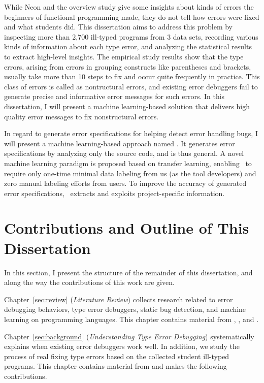 \documentclass[12pt]{report}	%
\begin{document}
While Neon and the overview study give some insights about kinds of errors the beginners of
functional programming made, they do not tell how errors were fixed and what students did.
%
This dissertation aims to address this problem by inspecting more than 2,700
ill-typed programs from 3 data sets,
recording various kinds of information about each type error, 
and analyzing the statistical results to extract high-level insights.
%
The empirical study results show that the type errors, arising from errors in grouping constructs like parentheses and brackets,
usually take more than 10 steps to fix and occur quite frequently in practice.
This class of errors is called as nontructural errors,
and existing error debuggers fail to generate precise and informative error messages for such errors.
In this dissertation, I will present a machine learning-based solution that delivers high quality error messages to fix nonstructural errors.
%

In regard to generate error specifications for helping detect error handling bugs,
I will present a machine learning-based approach named \newTool. 
It generates error specifications by analyzing only the source code, 
and is thus general. 
%
A novel machine learning paradigm is proposed based on transfer learning,
enabling \newTool\ to require only one-time minimal data labeling from us (as the tool developers)
and zero manual labeling efforts from users.
%
To improve the accuracy of generated error specifications,
\newTool\ extracts and exploits project-specific information.


\section{Contributions and Outline of This Dissertation}

In this section, I present the structure of the remainder of this dissertation,
and along the way the contributions of this work are given.

Chapter~\ref{sec:review} (\emph{Literature Review}) collects research related to error debugging behaviors,  
type error debuggers, static bug detection, and machine learning on programming languages.
This chapter contains material from \cite{wu2017type}, \cite{wu2017learning}, and \cite{Wu:2019:GPE:3366395.3360586}.

Chapter~\ref{sec:background} (\emph{Understanding Type Error Debugging}) systematically explains when existing error debuggers work well.
%
In addition, we study the process of real fixing type errors based on the collected student ill-typed programs.
This chapter contains material from \cite{wu2017type} and makes the following contributions.
\end{document}
